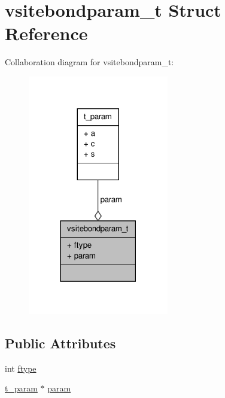 \hypertarget{structvsitebondparam__t}{\section{vsitebondparam\-\_\-t \-Struct \-Reference}
\label{structvsitebondparam__t}
}


\-Collaboration diagram for vsitebondparam\-\_\-t\-:
\nopagebreak
\begin{figure}[H]
\begin{center}
\leavevmode
\includegraphics[width=174pt]{structvsitebondparam__t__coll__graph}
\end{center}
\end{figure}
\subsection*{\-Public \-Attributes}
\begin{DoxyCompactItemize}
\item 
int \hyperlink{structvsitebondparam__t_ad111d520426cb0dd2d7e2ec70115da91}{ftype}
\item 
\hyperlink{structt__param}{t\-\_\-param} $\ast$ \hyperlink{structvsitebondparam__t_a367f28839ed1bb2c2b8fe622a7a87fb7}{param}
\end{DoxyCompactItemize}


